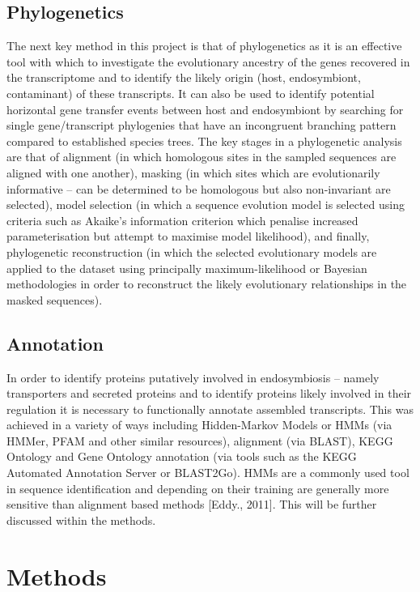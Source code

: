 \documentclass[a4paper,11pt]{article}
\begin{document}
\subsection{Phylogenetics}
The next key method in this project is that of phylogenetics as it is an effective tool with which to investigate the evolutionary ancestry of the genes recovered in the transcriptome and to identify the likely origin (host, endosymbiont, contaminant) of these transcripts.  
It can also be used to identify potential horizontal gene transfer events between host and endosymbiont by searching for single gene/transcript phylogenies that have an incongruent branching pattern compared to established species trees.    
The key stages in a phylogenetic analysis are that of alignment (in which homologous sites in the sampled sequences are aligned with one another), masking (in which sites which are evolutionarily informative – can be determined to be homologous but also non-invariant are selected), model selection (in which a sequence evolution model is selected using criteria such as Akaike's information criterion which penalise increased parameterisation but attempt to maximise model likelihood), and finally, phylogenetic reconstruction (in which the selected evolutionary models are applied to the dataset using principally maximum-likelihood or Bayesian methodologies in order to reconstruct the likely evolutionary relationships in the masked sequences). 

\subsection{Annotation}
In order to identify proteins putatively involved in endosymbiosis – namely transporters and secreted proteins and to identify proteins likely involved in their regulation it is necessary to functionally annotate assembled transcripts.  
This was achieved in a variety of ways including Hidden-Markov Models or HMMs (via HMMer, PFAM and other similar resources), alignment (via BLAST), KEGG Ontology and Gene Ontology annotation (via tools such as the KEGG Automated Annotation Server or BLAST2Go). 
HMMs are a commonly used tool in sequence identification and depending on their training are generally more sensitive than alignment based methods [Eddy., 2011].
This will be further discussed within the methods.

\section{Methods}
\end{document}
